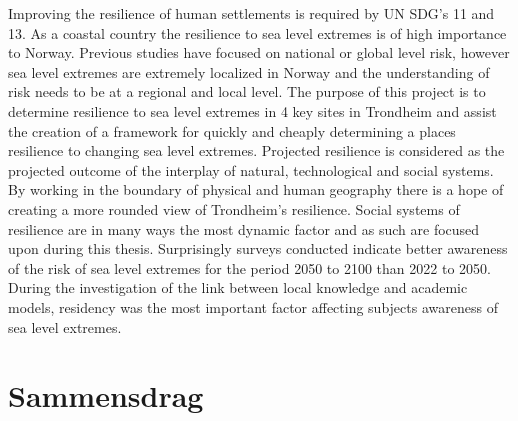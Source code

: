 Improving the resilience of human settlements is required by UN SDG's 11 and 13. As a coastal country the resilience to sea level extremes is of high importance to Norway. Previous studies have focused on national or global level risk, however sea level extremes are extremely localized in Norway and the understanding of risk needs to be at a regional and local level. The purpose of this project is to determine resilience to sea level extremes in 4 key sites in Trondheim and assist the creation of a framework for quickly and cheaply determining a places resilience to changing sea level extremes. Projected resilience is considered as the projected outcome of the interplay of natural, technological and social systems. By working in the boundary of physical and human geography there is a hope of creating a more rounded view of Trondheim's resilience. Social systems of resilience are in many ways the most dynamic factor and as such are focused upon during this thesis. Surprisingly surveys conducted indicate better awareness of the risk of sea level extremes for the period 2050 to 2100 than 2022 to 2050. During the investigation of the link between local knowledge and academic models, residency was the most important factor affecting subjects awareness of sea level extremes.   



\section{Sammensdrag}


